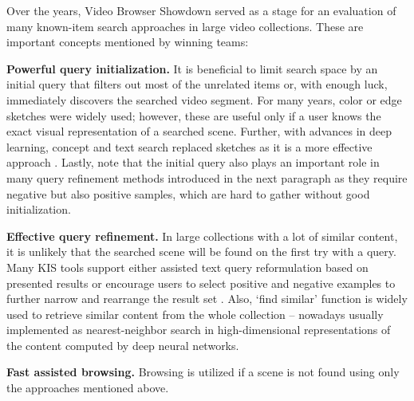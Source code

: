 Over the years, Video Browser Showdown served as a stage for an evaluation of many known-item search approaches in large video collections. These are important concepts mentioned by winning teams:
\begin{description}[labelwidth=1em, leftmargin=!]
	\item \textbf{Powerful query initialization.} It is beneficial to limit search space by an initial query that filters out most of the unrelated items or, with enough luck, immediately discovers the searched video segment. For many years, color \cite{BlazekAdam2015} or edge sketches were widely used; however, these are useful only if a user knows the exact visual representation of a searched scene. Further, with advances in deep learning, concept and text search replaced sketches as it is a more effective approach \cite{LokocVBS2020_VIRET, vitrivr2020}. Lastly, note that the initial query also plays an important role in many query refinement methods introduced in the next paragraph as they require negative but also positive samples, which are hard to gather without good initialization.
	\item \textbf{Effective query refinement.} In large collections with a lot of similar content, it is unlikely that the searched scene will be found on the first try with a query. Many KIS tools support either assisted text query reformulation based on presented results or encourage users to select positive and negative examples to further narrow and rearrange the result set \cite{Exquisitor_VBS2020,SOMHunterVBS2020}. Also, `find similar' function is widely used to retrieve similar content from the whole collection \cite{LokocVBS2019_Nasnet, vitrivr2020} -- nowadays usually implemented as nearest-neighbor search in high-dimensional representations of the content computed by deep neural networks.
	\item \textbf{Fast assisted browsing.} Browsing is utilized if a scene is not found using only the approaches mentioned above. %

\end{description}
